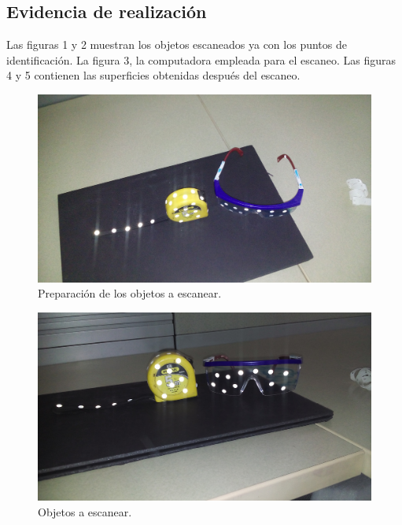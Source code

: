 
\subsection{Evidencia de realizaci\'on}
Las figuras 1 y 2 muestran los objetos escaneados ya con los puntos de identificaci\'on. La figura 3, la
computadora empleada para el escaneo. Las figuras 4 y 5 contienen las superficies obtenidas despu\'es del
escaneo.

 \begin{figure}[!htbp]
 \centering
 \includegraphics [scale=0.1]
 {./img/20160502_180537.jpg}
  \caption{Preparaci\'on de los objetos a escanear.}
 \end{figure}

 \begin{figure}[!htbp]
 \centering
 \includegraphics [scale=0.1]
 {./img/20160502_180544.jpg}
  \caption{Objetos a escanear.}
 \end{figure}

